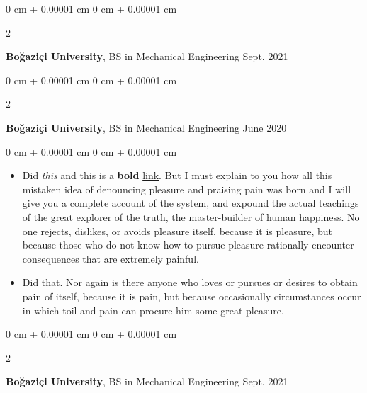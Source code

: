 \documentclass[10pt, letterpaper]{article}
\newenvironment{highlights}{
    \begin{itemize}[
        topsep=0.10 cm,
        parsep=0.10 cm,
        partopsep=0pt,
        itemsep=0pt,
        leftmargin=0 cm + 10pt
    ]
}{
    \end{itemize}
} %
\newenvironment{onecolentry}{
    \begin{adjustwidth}{
        0 cm + 0.00001 cm
    }{
        0 cm + 0.00001 cm
    }
}{
    \end{adjustwidth}
} %
\newenvironment{twocolentry}[2][]{
    \onecolentry
    \def\secondColumn{#2}
    \setcolumnwidth{\fill, 4.5 cm}
    \begin{paracol}{2}
}{
    \switchcolumn \raggedleft \secondColumn
    \end{paracol}
    \endonecolentry
} %
\begin{document}
        \begin{twocolentry}{
            Sept. 2021
        }
            \textbf{Boğaziçi University}, BS in Mechanical Engineering\end{twocolentry}



        \vspace{0.2 cm}

        \begin{twocolentry}{
            June 2020
        }
            \textbf{Boğaziçi University}, BS in Mechanical Engineering\end{twocolentry}

        \vspace{0.10 cm}
        \begin{onecolentry}
            \begin{highlights}
                \item Did \textit{this} and this is a \textbf{bold} \href{https://example.com}{link}. But I must explain to you how all this mistaken idea of denouncing pleasure and praising pain was born and I will give you a complete account of the system, and expound the actual teachings of the great explorer of the truth, the master-builder of human happiness. No one rejects, dislikes, or avoids pleasure itself, because it is pleasure, but because those who do not know how to pursue pleasure rationally encounter consequences that are extremely painful.
                \item Did that. Nor again is there anyone who loves or pursues or desires to obtain pain of itself, because it is pain, but because occasionally circumstances occur in which toil and pain can procure him some great pleasure.
            \end{highlights}
        \end{onecolentry}


        \vspace{0.2 cm}

        \begin{twocolentry}{
            Sept. 2021
        }
            \textbf{Boğaziçi University}, BS in Mechanical Engineering\end{twocolentry}
\end{document}
